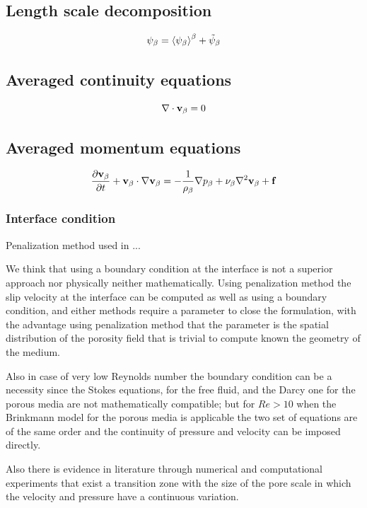 \subsection{Length scale decomposition}

\begin{equation}
	\psi_{\beta} = {\left< \psi_{\beta} \right>}^{\beta} + \tilde{\psi}_{\beta}
 \end{equation}

\subsection{Averaged continuity equations}


\begin{equation}
\nabla \cdot \textbf{v}_{\beta} = 0
\label{eq:cont_vans}
\end{equation}

\subsection{Averaged momentum equations}


\begin{equation}
\dfrac{\partial \textbf{v}_{\beta}}{\partial t} + \textbf{v}_{\beta} \cdot \nabla \textbf{v}_{\beta} = -\frac{1}{\rho_{\beta}} \nabla p_{\beta} + \nu_{\beta} \nabla^2  \textbf{v}_{\beta}  + \mathbf{f}
\label{eq:mom_vans}
\end{equation}



\subsubsection{Interface condition}

Penalization method \citet{angot1999penalization} used in\cite{bruneau2004passive} \cite{bruneau2008numerical} \cite{bruneau2010coupling}...


We think that using a boundary condition at the interface is not a superior approach nor physically neither mathematically.
Using penalization method the slip velocity at the interface can be computed as well as using a boundary condition, and either methods require a parameter to close the formulation, with the advantage using penalization method that the parameter is the spatial distribution of the porosity field that is trivial to compute known the geometry of the medium.

Also in case of very low Reynolds number the boundary condition can be a necessity since the Stokes equations, for the free fluid, and the Darcy one for the porous media are not mathematically compatible; but for $Re>10$ when the Brinkmann model for the porous media is applicable the two set of equations are of the same order and the continuity of pressure and velocity can be imposed directly.

Also there is evidence in literature through numerical and computational experiments \citet{ochoa2017fluid} that exist a transition zone with the size of the pore scale in which the velocity and pressure have a continuous variation.
